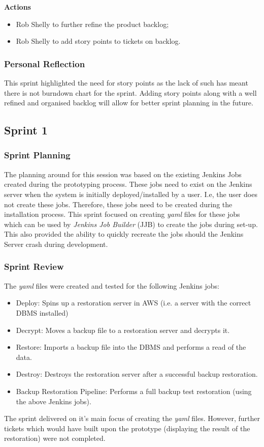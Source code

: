		\noindent\textbf{Actions}
		\begin{itemize}
			\item Rob Shelly to further refine the product backlog;
			\item Rob Shelly to add story points to tickets on backlog.
		\end{itemize}
		
		\subsubsection{Personal Reflection}
		This sprint highlighted the need for story points as the lack of such has meant there is not burndown chart for the sprint. Adding story points along with a well refined and organised backlog will allow for better sprint planning in the future.

	\subsection{Sprint 1}
		\subsubsection{Sprint Planning}
		The planning around for this session was based on the existing Jenkins Jobs created during the prototyping process. These jobs need to exist on the Jenkins server when the system is initially deployed/installed by a user. I.e, the user does not create these jobs.
		Therefore, these jobs need to be created during the installation process. This sprint focused on creating \textit{yaml} files for these jobs which can be used by \textit{Jenkins Job Builder} (JJB) to create the jobs during set-up. This also provided the ability to quickly recreate the jobs should the Jenkins Server crash during development.

		\subsubsection{Sprint Review}
		The \textit{yaml} files were created and tested for the following Jenkins jobs:
		\begin{itemize}
			\item Deploy: Spins up a restoration server in AWS (i.e. a server with the correct DBMS installed)
			\item Decrypt:  Moves a backup file to a restoration server and decrypts it.
			\item Restore: Imports a backup file into the DBMS and performs a read of the data.
			\item Destroy: Destroys the restoration server after a successful backup restoration.
			\item Backup Restoration Pipeline:	Performs a full backup test restoration (using the above Jenkins jobs).
		\end{itemize}
		The sprint delivered on it's main focus of creating the \textit{yaml} files. However, further tickets which would have built upon the prototype (displaying the result of the restoration) were not completed.

